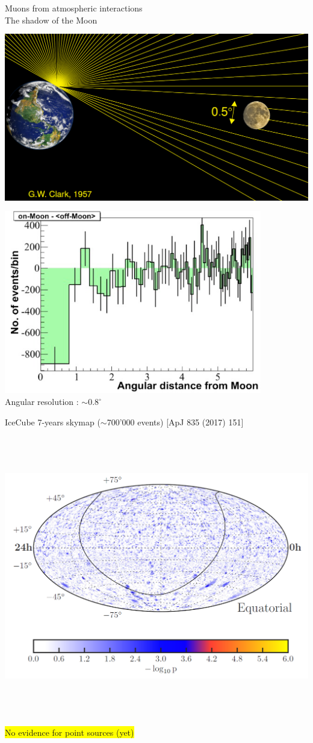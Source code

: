 \Tr
\onecolumn
\begin{center}
{\red Muons from atmospheric interactions}\\[1cm]
{\blue The shadow of the Moon}\\[5mm]
\includegraphics[keepaspectratio,height=8cm]{moon-shadow1}
\includegraphics[keepaspectratio,height=8cm]{moon-shadow2}\\[1cm]
{\blue Angular resolution : $\sim 0.8^{\circ}$}
\end{center}

\Tr
\onecolumn
\begin{center}
{\blue IceCube 7-years skymap ($\sim$700'000 events)} {\large [ApJ 835 (2017) 151]}
\includegraphics[keepaspectratio,height=13cm]{icecube-skymap-7years}\\
\colorbox{yellow}{No evidence for point sources (yet)}
\end{center}
